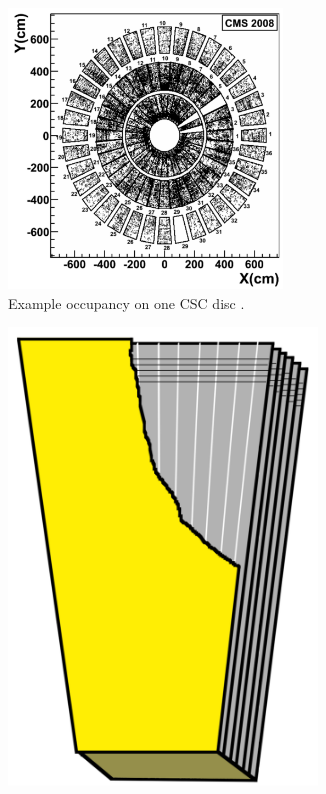 \begin{figure}
\centering
\begin{subfigure}[c]{0.55\textwidth}
\includegraphics[width=0.8\textwidth]{figs/cscring.png}
\caption[Example occupancy on one CSC disc.]{Example occupancy on one CSC disc \cite{cscperformance}.}
\label{fig:cscring}
\end{subfigure}
\begin{subfigure}[c]{0.3\textwidth}
\includegraphics[width=0.9\textwidth]{figs/cscchamber.png}

\end{subfigure}
\end{figure}
